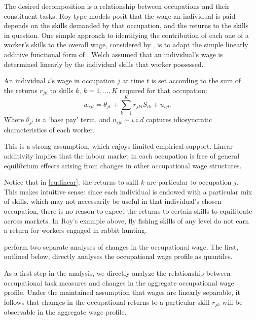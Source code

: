 The desired decomposition is a relationship between occupations and their constituent tasks. Roy-type models posit that the wage an individual is paid depends on the skills demanded by that occupation, and the returns to the skills in question. One simple approach to identifying the contribution of each one of a worker's skills to the overall wage, considered by \citet{Firpo2011}, is to adapt the simple linearly additive functional form of \citet{Welch1969}. Welch assumed that an individual's wage is determined linearly by the individual skills that worker possessed.
\begin{assumption} \label{ass:linear}
  An individual $i$'s wage in occupation $j$ at time $t$ is set according to the sum of the returns $r_{jk}$ to skills $k$, $k=1,\dots,K$ required for that occupation:
\begin{equation}
  w_{ijt} = \theta_{jt} + \sum_{k=1}^K r_{jkt}S_{ik} + u_{ijt}, \label{eq:linear}
\end{equation}
Where $\theta_{jt}$ is a `base pay' term, and $u_{ijt}\sim i.i.d$ captures idiosyncratic characteristics of each worker. 
\end{assumption}

This is a strong assumption, which enjoys limited empirical support. Linear additivity implies that the labour market in each occupation is free of general equilibrium effects arising from changes in other occupational wage structures.

Notice that in \eqref{eq:linear}, the returns to skill $k$ are particular to occupation $j$. This makes intuitive sense: since each individual is endowed with a particular mix of skills, which may not necessarily be useful in that individual's chosen occupation, there is no reason to expect the returns to certain skills to equilibrate across markets. In Roy's example above, fly fishing skills of any level do not earn a return for workers engaged in rabbit hunting. %

\citet{Firpo2011} perform two separate analyses of changes in the occupational wage. The first, outlined below, directly analyses the occupational wage profile as quantiles.

As a first step in the analysis, we directly analyze the relationship between occupational task measures and changes in the aggregate occupational wage profile. Under the maintained assumption that wages are linearly separable, it follows that changes in the occupational returns to a particular skill $r_{jk}$ will be observable in the aggregate wage profile.

